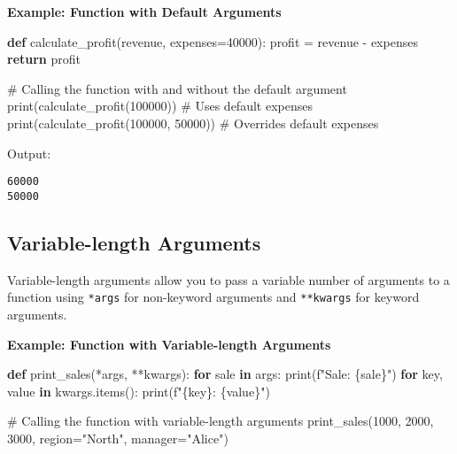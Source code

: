 \documentclass[
  letterpaper,
  DIV=11,
  numbers=noendperiod]{scrreprt}
\newenvironment{Shaded}{\begin{snugshade}}{\end{snugshade}}
\newcommand{\BuiltInTok}[1]{\textcolor[rgb]{0.00,0.23,0.31}{#1}}
\newcommand{\CommentTok}[1]{\textcolor[rgb]{0.37,0.37,0.37}{#1}}
\newcommand{\ControlFlowTok}[1]{\textcolor[rgb]{0.00,0.23,0.31}{\textbf{#1}}}
\newcommand{\DecValTok}[1]{\textcolor[rgb]{0.68,0.00,0.00}{#1}}
\newcommand{\KeywordTok}[1]{\textcolor[rgb]{0.00,0.23,0.31}{\textbf{#1}}}
\newcommand{\NormalTok}[1]{\textcolor[rgb]{0.00,0.23,0.31}{#1}}
\newcommand{\OperatorTok}[1]{\textcolor[rgb]{0.37,0.37,0.37}{#1}}
\newcommand{\SpecialCharTok}[1]{\textcolor[rgb]{0.37,0.37,0.37}{#1}}
\newcommand{\SpecialStringTok}[1]{\textcolor[rgb]{0.13,0.47,0.30}{#1}}
\newcommand{\StringTok}[1]{\textcolor[rgb]{0.13,0.47,0.30}{#1}}
\begin{document}
\textbf{Example: Function with Default Arguments}

\begin{Shaded}
\begin{Highlighting}[]
\KeywordTok{def}\NormalTok{ calculate\_profit(revenue, expenses}\OperatorTok{=}\DecValTok{40000}\NormalTok{):}
\NormalTok{    profit }\OperatorTok{=}\NormalTok{ revenue }\OperatorTok{{-}}\NormalTok{ expenses}
    \ControlFlowTok{return}\NormalTok{ profit}

\CommentTok{\# Calling the function with and without the default argument}
\BuiltInTok{print}\NormalTok{(calculate\_profit(}\DecValTok{100000}\NormalTok{))  }\CommentTok{\# Uses default expenses}
\BuiltInTok{print}\NormalTok{(calculate\_profit(}\DecValTok{100000}\NormalTok{, }\DecValTok{50000}\NormalTok{))  }\CommentTok{\# Overrides default expenses}
\end{Highlighting}
\end{Shaded}

Output:

\begin{verbatim}
60000
50000
\end{verbatim}

\subsection{Variable-length
Arguments}\label{variable-length-arguments-1}

Variable-length arguments allow you to pass a variable number of
arguments to a function using \texttt{*args} for non-keyword arguments
and \texttt{**kwargs} for keyword arguments.

\textbf{Example: Function with Variable-length Arguments}

\begin{Shaded}
\begin{Highlighting}[]
\KeywordTok{def}\NormalTok{ print\_sales(}\OperatorTok{*}\NormalTok{args, }\OperatorTok{**}\NormalTok{kwargs):}
    \ControlFlowTok{for}\NormalTok{ sale }\KeywordTok{in}\NormalTok{ args:}
        \BuiltInTok{print}\NormalTok{(}\SpecialStringTok{f"Sale: }\SpecialCharTok{\{}\NormalTok{sale}\SpecialCharTok{\}}\SpecialStringTok{"}\NormalTok{)}
    \ControlFlowTok{for}\NormalTok{ key, value }\KeywordTok{in}\NormalTok{ kwargs.items():}
        \BuiltInTok{print}\NormalTok{(}\SpecialStringTok{f"}\SpecialCharTok{\{}\NormalTok{key}\SpecialCharTok{\}}\SpecialStringTok{: }\SpecialCharTok{\{}\NormalTok{value}\SpecialCharTok{\}}\SpecialStringTok{"}\NormalTok{)}

\CommentTok{\# Calling the function with variable{-}length arguments}
\NormalTok{print\_sales(}\DecValTok{1000}\NormalTok{, }\DecValTok{2000}\NormalTok{, }\DecValTok{3000}\NormalTok{, region}\OperatorTok{=}\StringTok{"North"}\NormalTok{, manager}\OperatorTok{=}\StringTok{"Alice"}\NormalTok{)}
\end{Highlighting}
\end{Shaded}
\end{document}
